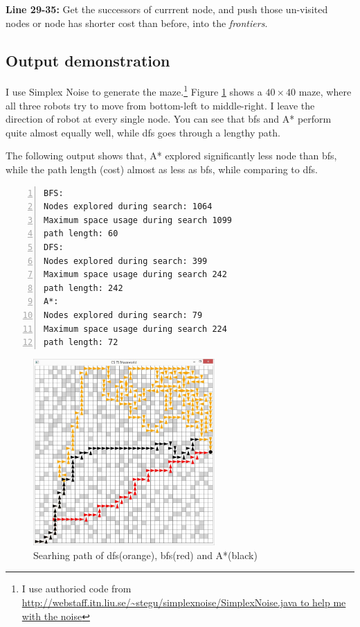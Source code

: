 \textbf{Line 29-35:} Get the successors of currrent node, and push those un-visited nodes or node has shorter cost than before, into the \emph{frontiers}.



\subsection{Output demonstration}



I use Simplex Noise to generate the maze.\footnote{I use authoried code from \url{http://webstaff.itn.liu.se/~stegu/simplexnoise/SimplexNoise.java to help me with the noise}} Figure \ref{s-1} shows a $40\times40$ maze, where all three robots try to move from bottom-left to middle-right. I leave the direction of robot at every single node. You can see that bfs and A* perform quite almost equally well, while dfs goes through a lengthy path.

The following output shows that, A* explored significantly less node than bfs, while the path length (cost) almost as less as bfs, while comparing to dfs.



\begin{lstlisting}[numbers=left]
BFS:
Nodes explored during search: 1064
Maximum space usage during search 1099
path length: 60
DFS:
Nodes explored during search: 399
Maximum space usage during search 242
path length: 242
A*:
Nodes explored during search: 79
Maximum space usage during search 224
path length: 72
\end{lstlisting}


\begin{figure}[!h]
\centering
\includegraphics[width=0.618\textwidth]{s-1-1.JPG}
\caption{Searhing path of dfs(orange), bfs(red) and A*(black)}
\label{s-1}
\end{figure}





